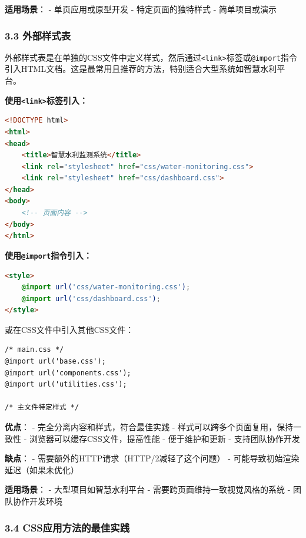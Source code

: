 \textbf{适用场景}： - 单页应用或原型开发 - 特定页面的独特样式 -
简单项目或演示

\subsubsection{3.3 外部样式表}\label{ux5916ux90e8ux6837ux5f0fux8868}

外部样式表是在单独的CSS文件中定义样式，然后通过\passthrough{\lstinline!<link>!}标签或\passthrough{\lstinline!@import!}指令引入HTML文档。这是最常用且推荐的方法，特别适合大型系统如智慧水利平台。

\textbf{使用\passthrough{\lstinline!<link>!}标签引入：}

\begin{lstlisting}[language=HTML]
<!DOCTYPE html>
<html>
<head>
    <title>智慧水利监测系统</title>
    <link rel="stylesheet" href="css/water-monitoring.css">
    <link rel="stylesheet" href="css/dashboard.css">
</head>
<body>
    <!-- 页面内容 -->
</body>
</html>
\end{lstlisting}

\textbf{使用\passthrough{\lstinline!@import!}指令引入：}

\begin{lstlisting}[language=HTML]
<style>
    @import url('css/water-monitoring.css');
    @import url('css/dashboard.css');
</style>
\end{lstlisting}

或在CSS文件中引入其他CSS文件：

\begin{lstlisting}
/* main.css */
@import url('base.css');
@import url('components.css');
@import url('utilities.css');

/* 主文件特定样式 */
\end{lstlisting}

\textbf{优点}： - 完全分离内容和样式，符合最佳实践 -
样式可以跨多个页面复用，保持一致性 - 浏览器可以缓存CSS文件，提高性能 -
便于维护和更新 - 支持团队协作开发

\textbf{缺点}： - 需要额外的HTTP请求（HTTP/2减轻了这个问题） -
可能导致初始渲染延迟（如果未优化）

\textbf{适用场景}： - 大型项目如智慧水利平台 -
需要跨页面维持一致视觉风格的系统 - 团队协作开发环境

\subsubsection{3.4
CSS应用方法的最佳实践}\label{cssux5e94ux7528ux65b9ux6cd5ux7684ux6700ux4f73ux5b9eux8df5}

